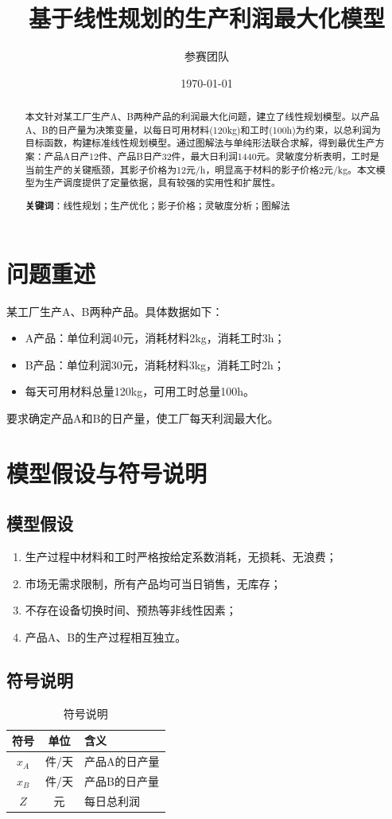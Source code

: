 \documentclass[12pt,a4paper]{ctexart}
\title{\textbf{基于线性规划的生产利润最大化模型}}
\author{参赛团队}
\date{\today}
\begin{document}
\maketitle

\begin{abstract}
本文针对某工厂生产A、B两种产品的利润最大化问题，建立了线性规划模型。以产品A、B的日产量为决策变量，以每日可用材料(120kg)和工时(100h)为约束，以总利润为目标函数，构建标准线性规划模型。通过图解法与单纯形法联合求解，得到最优生产方案：产品A日产12件、产品B日产32件，最大日利润1440元。灵敏度分析表明，工时是当前生产的关键瓶颈，其影子价格为12元/h，明显高于材料的影子价格2元/kg。本文模型为生产调度提供了定量依据，具有较强的实用性和扩展性。

\noindent\textbf{关键词}：线性规划；生产优化；影子价格；灵敏度分析；图解法
\end{abstract}

\section{问题重述}
某工厂生产A、B两种产品。具体数据如下：
\begin{itemize}
\item A产品：单位利润40元，消耗材料2kg，消耗工时3h；
\item B产品：单位利润30元，消耗材料3kg，消耗工时2h；
\item 每天可用材料总量120kg，可用工时总量100h。
\end{itemize}
要求确定产品A和B的日产量，使工厂每天利润最大化。

\section{模型假设与符号说明}
\subsection{模型假设}
\begin{enumerate}
\item 生产过程中材料和工时严格按给定系数消耗，无损耗、无浪费；
\item 市场无需求限制，所有产品均可当日销售，无库存；
\item 不存在设备切换时间、预热等非线性因素；
\item 产品A、B的生产过程相互独立。
\end{enumerate}

\subsection{符号说明}
\begin{table}[h!]
\centering
\caption{符号说明}
\begin{tabular}{ccl}
\toprule
符号 & 单位 & 含义 \\
\midrule
$x_A$ & 件/天 & 产品A的日产量 \\
$x_B$ & 件/天 & 产品B的日产量 \\
$Z$   & 元   & 每日总利润 \\
\bottomrule
\end{tabular}
\end{table}
\end{document}
